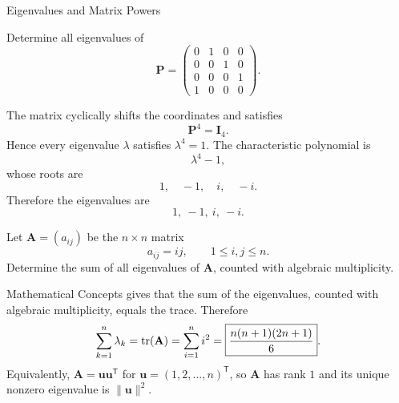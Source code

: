 \begin{expectedproblemgroup}{Eigenvalues and Matrix Powers}
        \begin{expectedsubproblem}
            Determine all eigenvalues of
            \[
                \mathbf{P}
                =
                \begin{pmatrix}
                    0&1&0&0\\
                    0&0&1&0\\
                    0&0&0&1\\
                    1&0&0&0
                \end{pmatrix}.
            \]
        \end{expectedsubproblem}

        \begin{expectedsubsolution}
            The matrix cyclically shifts the coordinates and satisfies
            \[
                \mathbf{P}^4=\mathbf{I}_4.
            \]
            Hence every eigenvalue $\lambda$ satisfies $\lambda^4=1$. The
            characteristic polynomial is
            \[
                \lambda^4-1,
            \]
            whose roots are
            \[
                1,\quad -1,\quad i,\quad -i.
            \]
            Therefore the eigenvalues are
            \[
                \boxed{1,\ -1,\ i,\ -i}.
            \]
        \end{expectedsubsolution}

        \begin{expectedsubproblem}
            Let $\mathbf{A}=(a_{ij})$ be the $n\times n$ matrix
            \[
                a_{ij}=ij,
                \qquad
                1\leq i,j\leq n.
            \]
            Determine the sum of all eigenvalues of $\mathbf{A}$, counted with
            algebraic multiplicity.
        \end{expectedsubproblem}

        \begin{expectedsubsolution}
            Mathematical Concepts gives that the sum of the eigenvalues,
            counted with algebraic multiplicity, equals the trace. Therefore
            \[
                \sum_{k=1}^{n}\lambda_k
                =
                \operatorname{tr}(\mathbf{A})
                =
                \sum_{i=1}^{n}i^2
                =
                \boxed{\frac{n(n+1)(2n+1)}{6}}.
            \]
            Equivalently, $\mathbf{A}=\mathbf{u}\mathbf{u}^{\mathsf T}$ for
            $\mathbf{u}=(1,2,\ldots,n)^{\mathsf T}$, so $\mathbf{A}$ has rank
            $1$ and its unique nonzero eigenvalue is $\|\mathbf{u}\|^2$.
        \end{expectedsubsolution}


\end{expectedproblemgroup}
